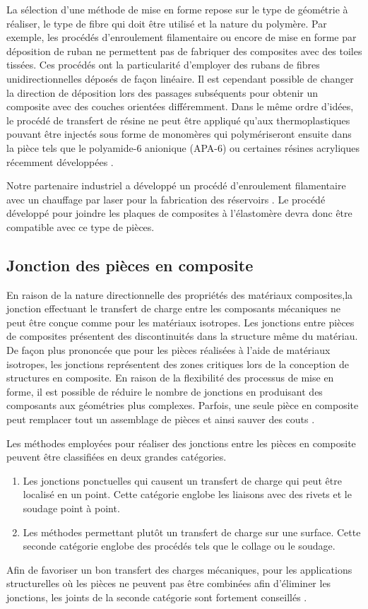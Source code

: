 La sélection d'une méthode de mise en forme repose sur le type de géométrie à réaliser, le type de fibre qui doit être utilisé et la nature du polymère. 
Par exemple, les procédés d'enroulement filamentaire ou encore de mise en forme par déposition de ruban ne permettent pas de fabriquer des composites avec des toiles tissées. 
Ces procédés ont la particularité d'employer des rubans de fibres unidirectionnelles déposés de façon linéaire. 
Il est cependant possible de changer la direction de déposition lors des passages subséquents pour obtenir un composite avec des couches orientées différemment. 
Dans le même ordre d'idées, le procédé de transfert de résine ne peut être appliqué qu'aux thermoplastiques pouvant être injectés sous forme de monomères qui polymériseront ensuite dans la pièce tels que le polyamide-6 anionique (APA-6) \cite{Rijswijk2006} ou certaines résines acryliques récemment développées \cite{Penumadu2019,Murray2019}. 

Notre partenaire industriel a développé un procédé d'enroulement filamentaire avec un chauffage par laser pour la fabrication des réservoirs \cite{Krzeminski2014}. 
Le procédé développé pour joindre les plaques de composites à l'élastomère devra donc être compatible avec ce type de pièces. 

\subsection{Jonction des pièces en composite}

En raison de la nature directionnelle des propriétés des matériaux composites,la jonction effectuant le transfert de charge entre les composants mécaniques ne peut être conçue comme pour les matériaux isotropes. 
Les jonctions entre pièces de composites présentent des discontinuités dans la structure même du matériau. 
De façon plus prononcée que pour les pièces réalisées à l'aide de matériaux isotropes, les jonctions représentent des zones critiques lors de la conception de structures en composite. 
En raison de la flexibilité des processus de mise en forme, il est possible de réduire le nombre de jonctions en produisant des composants aux géométries plus complexes. 
Parfois, une seule pièce en composite peut remplacer tout un assemblage de pièces et ainsi sauver des couts \cite{KarenMas_CW2004}. 

Les méthodes employées pour réaliser des jonctions entre les pièces en composite peuvent être classifiées en deux grandes catégories. 
\begin{enumerate}
	\item Les jonctions ponctuelles qui causent un transfert de charge qui peut être localisé en un point. 
	Cette catégorie englobe les liaisons avec des rivets et le soudage point à point. 
	\item Les méthodes permettant plutôt un transfert de charge sur une surface. 
	Cette seconde catégorie englobe des procédés tels que le collage ou le soudage. 
\end{enumerate}
Afin de favoriser un bon transfert des charges mécaniques, pour les applications structurelles où les pièces ne peuvent pas être combinées afin d'éliminer les jonctions, les joints de la seconde catégorie sont fortement conseillés \cite{campbell2003}. 

